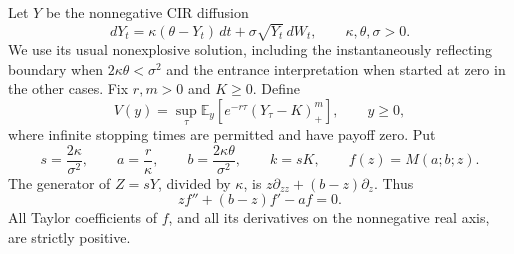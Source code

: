 \documentclass[11pt,a4paper]{article}
\theoremstyle{definition}
\theoremstyle{remark}
\numberwithin{equation}{section}
\begin{document}
Let $Y$ be the nonnegative CIR diffusion
\begin{equation}\label{p1:stp:sde}
 dY_t=\kappa(\theta-Y_t)\,dt+\sigma\sqrt{Y_t}\,dW_t,
 \qquad \kappa,\theta,\sigma>0.
\end{equation}
We use its usual nonexplosive solution, including the instantaneously
reflecting boundary when $2\kappa\theta<\sigma^2$ and the entrance
interpretation when started at zero in the other cases.  Fix $r,m>0$
and $K\ge0$.  Define
\begin{equation}\label{p1:stp:value}
 V(y)=\sup_\tau\mathbb E_y\!\left[
 e^{-r\tau}(Y_\tau-K)_+^m\right],\qquad y\ge0,
\end{equation}
where infinite stopping times are permitted and have payoff zero.
Put
\begin{equation}\label{p1:stp:normalization}
 s=\frac{2\kappa}{\sigma^2},\qquad
 a=\frac r\kappa,\qquad b=\frac{2\kappa\theta}{\sigma^2},
 \qquad k=sK,\qquad f(z)=M(a;b;z).
\end{equation}
The generator of $Z=sY$, divided by $\kappa$, is
$z\partial_{zz}+(b-z)\partial_z$.  Thus
\begin{equation}\label{p1:stp:kummer}
 zf''+(b-z)f'-af=0.
\end{equation}
All Taylor coefficients of $f$, and all its derivatives on the
nonnegative real axis, are strictly positive.
\end{document}
